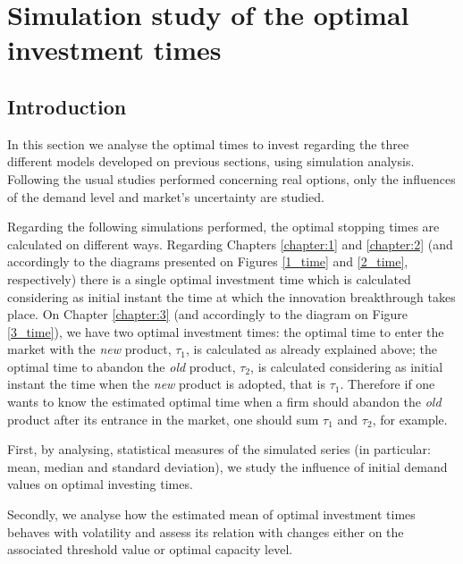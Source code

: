 \chapter{%
Simulation study of the optimal investment times}
\label{chapter:stoptime}



\section{Introduction}
\label{section:stoptime_intro}

In this section we analyse the optimal times to invest regarding the three different models developed on previous sections, using simulation analysis. Following the usual studies performed concerning real options, only the influences of the demand level and market's uncertainty are studied.

Regarding the following simulations performed, the optimal stopping times are calculated on different ways.
Regarding Chapters \ref{chapter:1} and \ref{chapter:2} (and accordingly to the diagrams presented on Figures \ref{1_time} and \ref{2_time}, respectively) there is a single optimal investment time which is calculated considering as initial instant the time at which the innovation breakthrough takes place.
On Chapter \ref{chapter:3} (and accordingly to the diagram on Figure \ref{3_time}), we have two optimal investment times: the optimal time to enter the market with the \textit{new} product, $\tau_1$, is calculated as already explained above; the optimal time to abandon the \textit{old} product, $\tau_2$, is calculated considering as initial instant the time when the \textit{new} product is adopted, that is $\tau_1$. Therefore if one wants to know the estimated optimal time when a firm should abandon the \textit{old} product after its entrance in the market, one should sum $\tau_1$ and $\tau_2$, for example.


First, by analysing, statistical measures of the simulated series (in particular: mean, median and standard deviation), we study the influence of initial demand values on optimal investing times.

Secondly, we analyse how the estimated mean of optimal investment times behaves with volatility and assess its relation with changes  either on the associated threshold value or optimal capacity level.

